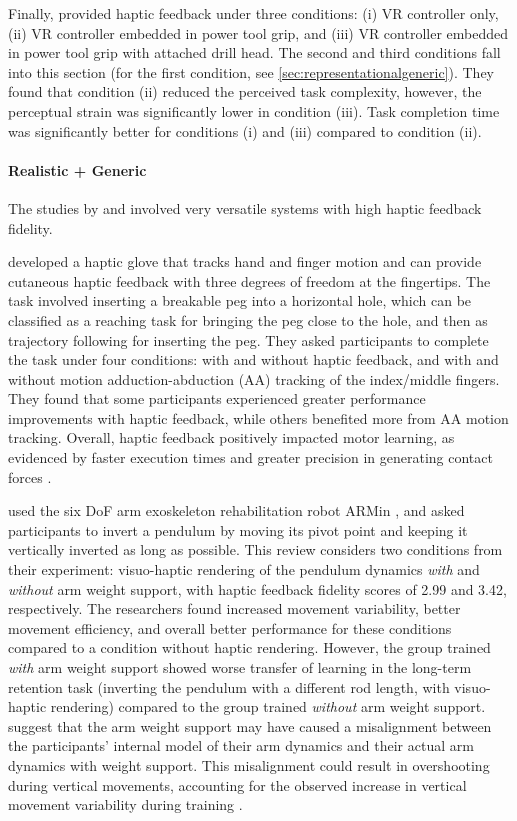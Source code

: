 Finally, \cite{Yang2023} provided haptic feedback under three conditions: (i) VR controller only, (ii) VR controller embedded in power tool grip, and (iii) VR controller embedded in power tool grip with attached drill head. The second and third conditions fall into this section (for the first condition, see \ref{sec:representationalgeneric}). They found that condition (ii) reduced the perceived task complexity, however, the perceptual strain was significantly lower in condition (iii). Task completion time was significantly better for conditions (i) and (iii) compared to condition (ii).


\paragraph{Realistic + Generic} \label{sec:realisticgeneric}
The studies by \cite{LeeY2019} and \cite{Oezen2022} involved very versatile systems with high haptic feedback fidelity. 

\cite{LeeY2019} developed a haptic glove that tracks hand and finger motion and can provide cutaneous haptic feedback with three degrees of freedom at the fingertips. The task involved inserting a breakable peg into a horizontal hole, which can be classified as a reaching task for bringing the peg close to the hole, and then as trajectory following for inserting the peg. They asked participants to complete the task under four conditions: with and without haptic feedback, and with and without motion adduction-abduction (AA) tracking of the index/middle fingers. They found that some participants experienced greater performance improvements with haptic feedback, while others benefited more from AA motion tracking. Overall, haptic feedback positively impacted motor learning, as evidenced by faster execution times and greater precision in generating contact forces \cite{LeeY2019}.

\cite{Oezen2022} used the six DoF arm exoskeleton rehabilitation robot ARMin \cite{Just2018ExoskeletonObserver}, and asked participants to invert a pendulum by moving its pivot point and keeping it vertically inverted as long as possible. This review considers two conditions from their experiment: visuo-haptic rendering of the pendulum dynamics \textit{with} and \textit{without} arm weight support, with haptic feedback fidelity scores of 2.99 and 3.42, respectively. The researchers found increased movement variability, better movement efficiency, and overall better performance for these conditions compared to a condition without haptic rendering. However, the group trained \textit{with} arm weight support showed worse transfer of learning in the long-term retention task (inverting the pendulum with a different rod length, with visuo-haptic rendering) compared to the group trained \textit{without} arm weight support. \cite{Oezen2022} suggest that the arm weight support may have caused a misalignment between the participants' internal model of their arm dynamics and their actual arm dynamics with weight support. This misalignment could result in overshooting during vertical movements, accounting for the observed increase in vertical movement variability during training \cite{Oezen2022}.

